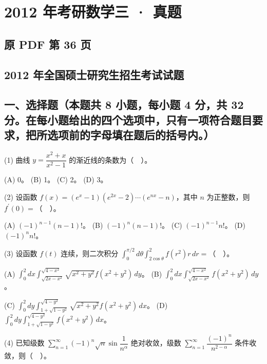 \documentclass[UTF8,12pt]{ctexart}
\begin{document}
\section*{2012 年考研数学三 · 真题}
\subsection*{原 PDF 第 36 页}

\subsection*{2012 年全国硕士研究生招生考试试题}

\subsection*{一、选择题（本题共 8 小题，每小题 4 分，共 32 分。在每小题给出的四个选项中，只有一项符合题目要求，把所选项前的字母填在题后的括号内。）}

(1) 曲线 \(\displaystyle y=\dfrac{\displaystyle x^2+x}{\displaystyle x^2-1}\) 的渐近线的条数为（　）。


(A) 0。 (B) 1。 (C) 2。 (D) 3。


(2) 设函数 \(\displaystyle f(x)=(e^x-1)(e^{2x}-2)\cdots(e^{nx}-n)\)，其中 \(\displaystyle n\) 为正整数，则 \(\displaystyle f^{\prime}(0)=\)（　）。


(A) \(\displaystyle (-1)^{n-1}(n-1)!\)。 (B) \(\displaystyle (-1)^n(n-1)!\)。 (C) \(\displaystyle (-1)^{n-1}n!\)。 (D) \(\displaystyle (-1)^nn!\)。


(3) 设函数 \(\displaystyle f(t)\) 连续，则二次积分 \(\displaystyle \int_0^{\pi/2}d\theta\displaystyle \int_{2\cos\theta}^2 f(r^2)r\,dr=\)（　）。


(A) \(\displaystyle \int_0^2dx\displaystyle \int_{\sqrt{2x-x^2}}^{\sqrt{4-x^2}}\sqrt{x^2+y^2}f(x^2+y^2)\,dy\)。 (B) \(\displaystyle \int_0^2dx\displaystyle \int_{\sqrt{2x-x^2}}^{\sqrt{4-x^2}}f(x^2+y^2)\,dy\)。


(C) \(\displaystyle \int_0^2dy\displaystyle \int_{1+\sqrt{1-y^2}}^{\sqrt{4-y^2}}\sqrt{x^2+y^2}f(x^2+y^2)\,dx\)。 (D) \(\displaystyle \int_0^2dy\displaystyle \int_{1+\sqrt{1-y^2}}^{\sqrt{4-y^2}}f(x^2+y^2)\,dx\)。


(4) 已知级数 \(\displaystyle \sum_{n=1}^{\infty}(-1)^n\sqrt n\sin\dfrac{\displaystyle 1}{\displaystyle n^\alpha}\) 绝对收敛，级数 \(\displaystyle \sum_{n=1}^{\infty}\dfrac{\displaystyle (-1)^n}{\displaystyle n^{2-\alpha}}\) 条件收敛，则（　）。
\end{document}
